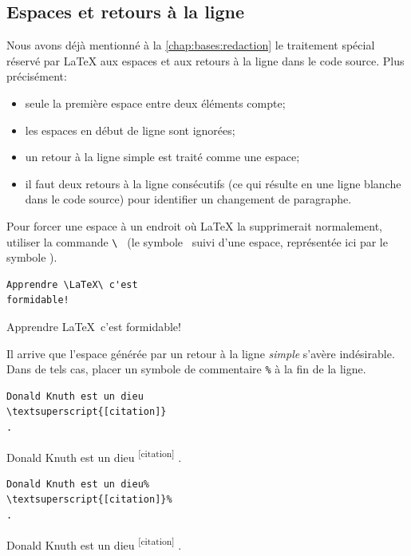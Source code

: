 \subsection{Espaces et retours à la ligne}
\label{chap:bases:caracteres:espaces}

Nous avons déjà mentionné à la \autoref{chap:bases:redaction} le
traitement spécial réservé par {\LaTeX} aux espaces et aux retours à
la ligne dans le code source. Plus précisément:
\begin{itemize}
\item seule la première espace entre deux éléments compte;
\item les espaces en début de ligne sont ignorées;
\item un retour à la ligne simple est traité comme une espace;
\item il faut deux retours à la ligne consécutifs (ce qui résulte en
  une ligne blanche dans le code source) pour identifier un changement
  de paragraphe.
\end{itemize}

Pour forcer une espace à un endroit où {\LaTeX} la supprimerait
normalement, utiliser la commande \verb*=\ = (le symbole \bs\ suivi
d'une espace, représentée ici par le symbole \textvisiblespace).
\begin{demo}
  \begin{texample}
\begin{lstlisting}
Apprendre \LaTeX\ c'est
formidable!
\end{lstlisting}
    \producing
    Apprendre \LaTeX\ c'est
    formidable!
  \end{texample}
\end{demo}

Il arrive que l'espace générée par un retour à la ligne \emph{simple}
s'avère indésirable. Dans de tels cas, placer un symbole de
commentaire \verb=%= à la fin de la ligne.
\begin{demo}
  \begin{texample}
\begin{lstlisting}
Donald Knuth est un dieu
\textsuperscript{[citation]}
.
\end{lstlisting}
    \producing
    Donald Knuth est un dieu
    \textsuperscript{[citation]}
    .
  \end{texample}
  \begin{texample}
\begin{lstlisting}
Donald Knuth est un dieu%
\textsuperscript{[citation]}%
.
\end{lstlisting}
    \producing
    Donald Knuth est un dieu%
    \textsuperscript{[citation]}%
    .
  \end{texample}
\end{demo}

